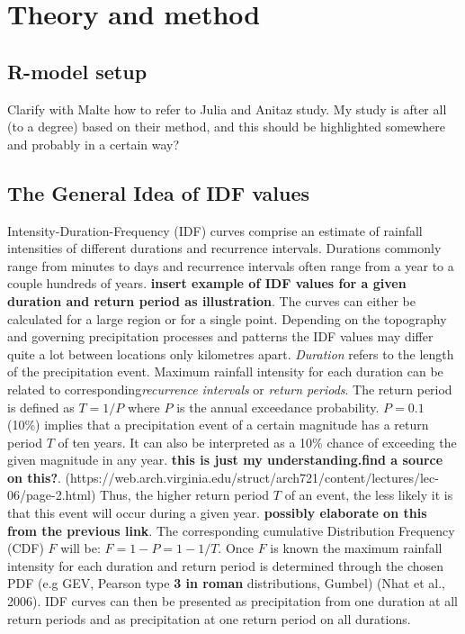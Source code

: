 \section{Theory and method}
\label{sec:theory}

\subsection{R-model setup}

Clarify with Malte how to refer to Julia and Anitaz study. My study is after all (to a degree) based on their method, and this should be highlighted somewhere and 
probably in a certain way?

\subsection{The General Idea of IDF values} 


Intensity-Duration-Frequency (IDF) curves comprise an estimate of rainfall intensities of different durations and recurrence intervals. Durations commonly range from minutes to days and recurrence intervals often range from a year to a couple hundreds of years. \textbf{insert example of IDF values for a given duration and return period as illustration}. The curves can either be calculated for a large region or for a single point. Depending on the topography and governing precipitation processes and patterns the IDF values may differ quite a lot between locations only kilometres apart. \textit{Duration} refers to the length of the precipitation event. Maximum rainfall intensity for each duration can be related to corresponding\textit{recurrence intervals} or \textit{return periods}. The return period is defined as $T = 1/P$ where $P$ is the annual exceedance probability. $P = 0.1$  (10\%)  implies that a precipitation event of a certain magnitude has a return period $T$ of ten years. It can also be interpreted as a 10\% chance of exceeding the given magnitude in any year. \textbf{this is just my understanding.find a source on this?}. (https://web.arch.virginia.edu/struct/arch721/content/lectures/lec-06/page-2.html) Thus, the higher return period $T$ of an event, the less likely it is that this event will occur during a given year. \textbf{possibly elaborate on this from the previous link}. The corresponding cumulative Distribution Frequency (CDF) $F$ will be: $F = 1-P = 1-1/T$. Once $F$ is known the maximum rainfall intensity for each duration and return period is determined through the chosen PDF (e.g GEV, Pearson type \textbf{3 in roman} distributions, Gumbel) (Nhat et al., 2006). IDF curves can then be presented as precipitation from one duration at all return periods and as precipitation at one return period on all durations. 


